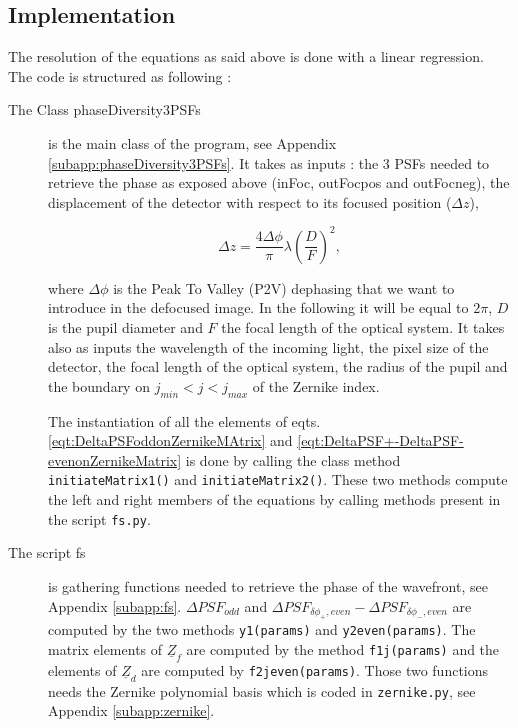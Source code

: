 \subsection{Implementation}

The resolution of the equations as said above is done with a linear regression. The code is structured as following :

\begin{description}
\item[The Class phaseDiversity3PSFs] is the main class of the program, see Appendix \ref{subapp:phaseDiversity3PSFs}. It takes as inputs : the 3 PSFs needed to retrieve the phase as exposed above (inFoc, outFocpos and outFocneg), the displacement of the detector with respect to its focused position ($\Delta z$),

\begin{equation}
\Delta z = \frac{4\Delta\phi}{\pi}\lambda \left(\frac{D}{F}\right)^2,
\label{eqt:Deltaz}
\end{equation}

where $\Delta\phi$ is the Peak To Valley (P2V) dephasing that we want to introduce in the defocused image. In the following it will be equal to $2\pi$, $D$ is the pupil diameter and $F$ the focal length of the optical system. It takes also as inputs the wavelength of the incoming light, the pixel size of the detector, the focal length of the optical system, the radius of the pupil and the boundary on $j_{min}<j<j_{max}$ of the Zernike index. 

The instantiation of all the elements of eqts. \eqref{eqt:DeltaPSFoddonZernikeMAtrix} and \eqref{eqt:DeltaPSF+-DeltaPSF-evenonZernikeMatrix} is done by calling the class method \verb!initiateMatrix1()! and \verb!initiateMatrix2()!. These two methods compute the left and right members of the equations by calling methods present in the script \verb!fs.py!.

\item[The script fs] is  gathering functions needed to retrieve the phase of the wavefront, see Appendix \ref{subapp:fs}. $\Delta PSF_{odd}$ and $\Delta PSF_{\delta\phi_+, even}-\Delta PSF_{\delta\phi_-, even}$ are computed by the two methods \verb!y1(params)! and \verb!y2even(params)!. The matrix elements of $\underline{Z}_f$ are computed by the method \verb!f1j(params)! and the elements of $\underline{Z}_d$ are computed by \verb!f2jeven(params)!. Those two functions needs the Zernike polynomial basis which is coded in \verb!zernike.py!, see Appendix \ref{subapp:zernike}.
\end{description}


